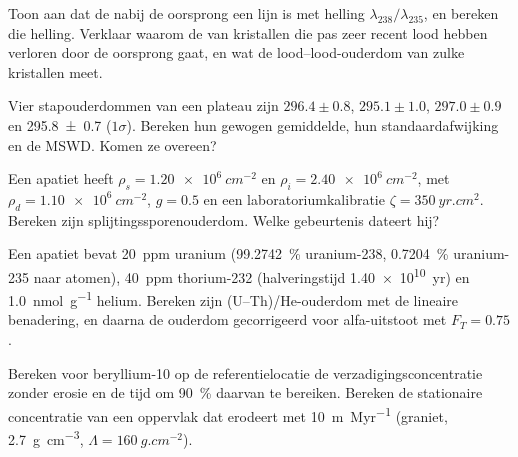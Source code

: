 \begin{exercise}[$\star\star$]\label{exo:b3:advanced-geochronology:5}
Toon aan dat de  nabij de oorsprong een lijn is met helling
$\lambda_{238}/\lambda_{235}$, en bereken die helling. Verklaar waarom de  van
kristallen die pas zeer recent lood hebben verloren door de oorsprong gaat, en
wat de lood--lood-ouderdom van zulke kristallen meet.
\end{exercise}

\begin{exercise}[$\star\star$]\label{exo:b3:advanced-geochronology:6}
Vier stapouderdommen van een plateau zijn $296.4 \pm 0.8$, $295.1 \pm 1.0$, $297.0 \pm
0.9$ en \qty[separate-uncertainty=true]{295.8 \pm 0.7}{\Ma} ($1\sigma$). Bereken hun gewogen gemiddelde,
hun standaardafwijking en de MSWD. Komen ze overeen?
\end{exercise}

\begin{exercise}[$\star\star$]\label{exo:b3:advanced-geochronology:7}
Een apatiet heeft $\rho_s = \qty{1.20e6}{cm^{-2}}$ en $\rho_i =
\qty{2.40e6}{cm^{-2}}$, met $\rho_d = \qty{1.10e6}{cm^{-2}}$, $g = 0.5$ en een
laboratoriumkalibratie $\zeta = \qty{350}{yr.cm^2}$. Bereken zijn
splijtingssporenouderdom. Welke gebeurtenis dateert hij?
\end{exercise}

\begin{exercise}[$\star\star$]\label{exo:b3:advanced-geochronology:8}
Een apatiet bevat \qty{20}{ppm} uranium (\qty{99.2742}{\percent}
uranium-238, \qty{0.7204}{\percent} uranium-235 naar atomen), \qty{40}{ppm}
thorium-232 (halveringstijd \qty{1.40e10}{yr}) en \qty{1.0}{nmol.g^{-1}} helium.
Bereken zijn (U--Th)/He-ouderdom met de lineaire benadering, en daarna de
ouderdom gecorrigeerd voor alfa-uitstoot met $F_T = 0.75$.
\end{exercise}

\begin{exercise}[$\star\star$]\label{exo:b3:advanced-geochronology:9}
Bereken voor beryllium-10 op de referentielocatie de verzadigingsconcentratie
zonder erosie en de tijd om \qty{90}{\percent} daarvan te bereiken. Bereken de
stationaire concentratie van een oppervlak dat erodeert met \qty{10}{m.Myr^{-1}} (graniet,
\qty{2.7}{g.cm^{-3}}, $\Lambda = \qty{160}{g.cm^{-2}}$).
\end{exercise}

